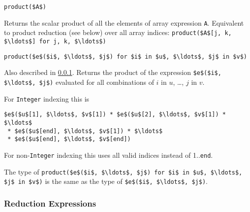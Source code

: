 \begin{operatordefinition*}[product]\label{modelica:product-of-array}
\begin{synopsis}\begin{lstlisting}
product($A$)
\end{lstlisting}\end{synopsis}
\begin{semantics}
Returns the scalar product of all the elements of array expression \lstinline!A!.  Equivalent to product reduction (see below) over all array indices: \lstinline!product($A$[j, k, $\ldots$] for j, k, $\ldots$)!
\end{semantics}
\end{operatordefinition*}

\begin{operatordefinition*}[product]\label{modelica:product-reduction}
\begin{synopsis}\begin{lstlisting}
product($e$($i$, $\ldots$, $j$) for $i$ in $u$, $\ldots$, $j$ in $v$)
\end{lstlisting}\end{synopsis}
\begin{semantics}
Also described in \cref{reduction-expressions}.  Returns the product of the expression \lstinline!$e$($i$, $\ldots$, $j$)! evaluated for all combinations of $i$ in $u$, \ldots, $j$ in $v$.

For \lstinline!Integer! indexing this is
\begin{lstlisting}[language=modelica]
$e$($u$[1], $\ldots$, $v$[1]) * $e$($u$[2], $\ldots$, $v$[1]) * $\ldots$
 * $e$($u$[end], $\ldots$, $v$[1]) * $\ldots$
 * $e$($u$[end], $\ldots$, $v$[end])
\end{lstlisting}
For non-\lstinline!Integer! indexing this uses all valid indices instead of 1..\lstinline!end!.

The type of \lstinline!product($e$($i$, $\ldots$, $j$) for $i$ in $u$, $\ldots$, $j$ in $v$)! is the same as the type of \lstinline!$e$($i$, $\ldots$, $j$)!.
\end{semantics}
\end{operatordefinition*}

\subsubsection{Reduction Expressions}\label{reduction-expressions}

